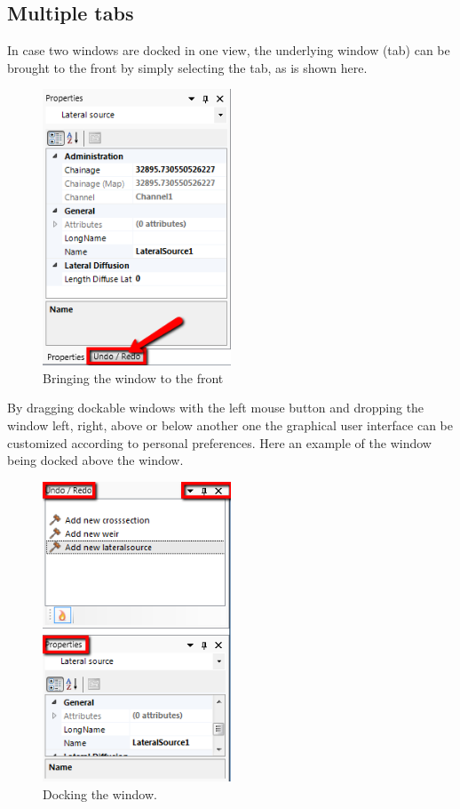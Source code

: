 \subsection{Multiple tabs}
\label{subsec:multipletabs}
In case two windows are docked in one view, the underlying window (tab) can be brought to the front by simply selecting the tab, as is shown here.
%
\begin{figure} [H]
	\centering
		\includegraphics[width=0.5\textwidth]{figures/chapter_overview/example_docking_UndoRedo_1.png}
	\caption{Bringing the  window to the front}
\end{figure}
%
By dragging dockable windows with the left mouse button and dropping the window left, right, above or below another one the graphical user interface can be customized according to personal preferences. Here an example of the  window being docked above the  window.
%
\begin{figure} [H]
	\centering
		\includegraphics[width=0.5\textwidth]{figures/chapter_overview/example_docking_UndoRedo_2.png}
	\caption{Docking the  window.}
	\label{fig:docking}
\end{figure}

